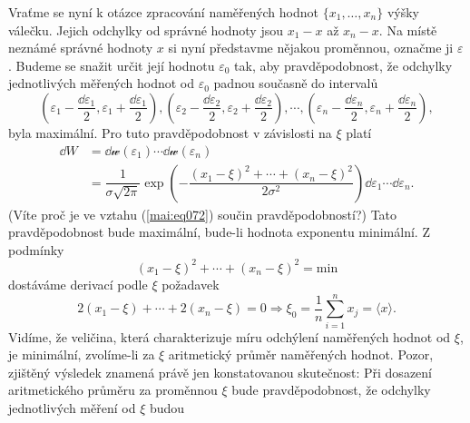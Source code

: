       Vraťme se nyní k otázce zpracování naměřených hodnot \(\lbrace x_1, \ldots, x_n\rbrace\) 
      výšky válečku. Jejich odchylky od správné hodnoty jsou \(x_1 - x\) až \(x_n - x\). Na místě 
      neznámé správné hodnoty \(x\) si nyní představme nějakou proměnnou, označme ji 
      \(\varepsilon\). Budeme se snažit určit její hodnotu \(\varepsilon_0\) tak, aby 
      pravděpodobnost, že odchylky jednotlivých měřených hodnot od \(\varepsilon_0\) padnou 
      současně do intervalů
      \begin{equation*}
        \left(\varepsilon_1 - \dfrac{\dd{\varepsilon_1}}{2}, 
              \varepsilon_1 + \dfrac{\dd{\varepsilon_1}}{2}
        \right),
        \left(\varepsilon_2 - \dfrac{\dd{\varepsilon_2}}{2}, 
              \varepsilon_2 + \dfrac{\dd{\varepsilon_2}}{2}
        \right), \cdots,
        \left(\varepsilon_n - \dfrac{\dd{\varepsilon_n}}{2}, 
              \varepsilon_n + \dfrac{\dd{\varepsilon_n}}{2}
        \right),
      \end{equation*}
      byla maximální. Pro tuto pravděpodobnost v závislosti na \(\xi\) platí
      \begin{align}
        \dd{W} &= \dd{\mathcal{w}(\varepsilon_1)}\cdots\dd{\mathcal{w}(\varepsilon_n)}  \nonumber\\
               &= \dfrac{1}{\sigma\sqrt{2\pi}}
                  \exp\left(-\dfrac{(x_1 - \xi)^2 + \cdots + (x_n - \xi)^2}{2\sigma^2}
                      \right)\dd{\varepsilon_1}\cdots\dd{\varepsilon_n}.      \label{mai:eq072}
      \end{align}
      (Víte proč je ve vztahu (\ref{mai:eq072}) součin pravděpodobností?) Tato pravděpodobnost bude 
      maximální, bude-li hodnota exponentu minimální. Z podmínky
      \begin{equation*}
        (x_1 - \xi)^2 + \cdots + (x_n - \xi)^2 = \text{min}
      \end{equation*}
      dostáváme derivací podle \(\xi\) požadavek
      \begin{equation*}
        2(x_1 - \xi) + \cdots + 2(x_n - \xi) = 0 \Rightarrow \xi_0 = 
        \dfrac{1}{n}\sum_{i=1}^{n}x_j = \langle x \rangle.
      \end{equation*}
      Vidíme, že veličina, která charakterizuje míru odchýlení naměřených hodnot od \(\xi\), je 
      minimální, zvolíme-li za \(\xi\) aritmetický průměr naměřených hodnot. Pozor, zjištěný 
      výsledek znamená právě jen konstatovanou skutečnost: Při dosazení aritmetického průměru za 
      proměnnou \(\xi\) bude pravděpodobnost, že odchylky jednotlivých měření od \(\xi\) budou 
